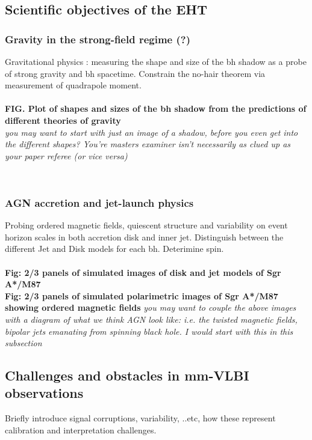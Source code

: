 \documentclass{article}
\begin{document}
\subsection{Scientific objectives of the EHT}




\subsubsection{Gravity in the strong-field regime (?)}
Gravitational physics : measuring the shape and size of the bh shadow as a probe of strong gravity and bh spacetime. Constrain the no-hair theorem via measurement of quadrapole moment.\\
~\\
{\bf FIG. Plot of shapes and sizes of the bh shadow from the predictions of different theories of gravity}\\
{\it you may want to start with just an image of a shadow, before you even get into the different shapes? You're masters examiner isn't necessarily as clued up as your paper referee (or vice versa)}

~\\
\subsubsection{AGN accretion and jet-launch physics} 
Probing ordered magnetic fields, quiescent structure and variability on event horizon scales in both accretion disk and inner jet. Distinguish between the different Jet and Disk models for each bh. Deterimine spin.\\
~\\
\textbf{Fig: 2/3 panels of simulated images of disk and jet models of Sgr A*/M87}\\
\textbf{Fig: 2/3 panels of simulated polarimetric images of Sgr A*/M87 showing ordered magnetic fields}
{\it you may want to couple the above images with a diagram of what we think AGN look like: i.e. the twisted magnetic fields, bipolar jets emanating from spinning black hole. I would start with this in this subsection}


\subsection{Challenges and obstacles in mm-VLBI observations}

Briefly introduce signal corruptions, variability, ..etc, how these represent calibration and interpretation challenges.
\end{document}
